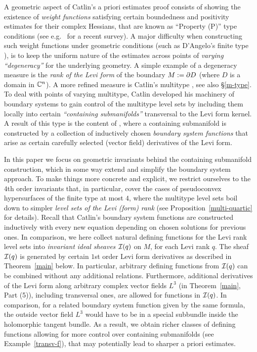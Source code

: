 \documentclass[12pt]{amsart}
\begin{document}
A geometric aspect of Catlin's a priori estimates proof
consists of showing the existence of {\em weight functions}
 satisfying certain boundedness and positivity estimates for their complex Hessians,
 that are known as ``Property (P)'' type conditions 
 (see e.g.\ \cite{BS16} for a recent survey).
A major difficulty when constructing such weight functions
under geometric conditions (such as D'Angelo's finite type \cite{D82}), 
is to keep the uniform 
nature of the estimates across points 
of {\em varying ``degeneracy''}
for the underlying geometry.
A simple example of a degeneracy measure
is the {\em rank of the Levi form} of the 
boundary $M:=\partial D$ (where $D$ is a domain in ${{\mathbb{C}}^n}$).
A more refined measure
is Catlin's multitype \cite{C84b}, see also \S\ref{m-type}.
To deal with points of varying multitype, 
Catlin developed his machinery of boundary systems \cite{C84b}
to gain control of the multitype level sets
by including them locally into certain {\em ``containing submanifolds''}
transversal to the Levi form kernel.
A result of this type is the content of 
\cite[Main Theorem, Part (2)]{C84b},
where a containing submanifold
is constructed by a collection of 
inductively chosen {\em boundary system functions}
that arise as certain carefully selected
(vector field) derivatives of the Levi form.

In this paper we focus on geometric invariants
behind the containing submanifold construction,
which in some way extend and simplify the boundary system approach.
To make things more concrete and explicit,
we restrict ourselves to the
$4$th order invariants that, in particular,
cover the cases of pseudoconvex hypersurfaces of the finite type
at most $4$,
where the multitype level sets
boil down to simpler {\em level sets of the
Levi (form) rank} (see Proposition~\ref{multi-quartic} for details).
Recall that Catlin's boundary system functions
\cite{C84b}
are constructed inductively with every new equation
depending on chosen solutions for previous ones.
In comparison, we here collect natural defining functions 
for the Levi rank level sets
into {\em invariant ideal sheaves ${\mathcal{I}}(q)$} on $M$,
for each Levi rank $q$.
The sheaf ${\mathcal{I}}(q)$ is generated
by certain $1$st order Levi form derivatives as
described in Theorem~\ref{main} below.
In particular, arbitrary defining functions from ${\mathcal{I}}(q)$
can be combined without any additional relations.
Furthermore, additional derivatives
of the Levi form along arbitrary complex vector fields $L^3$
(in Theorem~\ref{main}, Part (5)),
including transversal ones,
 are allowed for functions in ${\mathcal{I}}(q)$.
In comparison, for a related boundary system function
given by the same formula,
the outside vector field $L^3$
would have to be in a special subbundle
inside the holomorphic tangent bundle.
As a result, we obtain richer classes of defining functions
allowing for more control over containing submanifolds
(see Example~\ref{transv-f}),
that may potentially lead to sharper a priori estimates.
\end{document}
